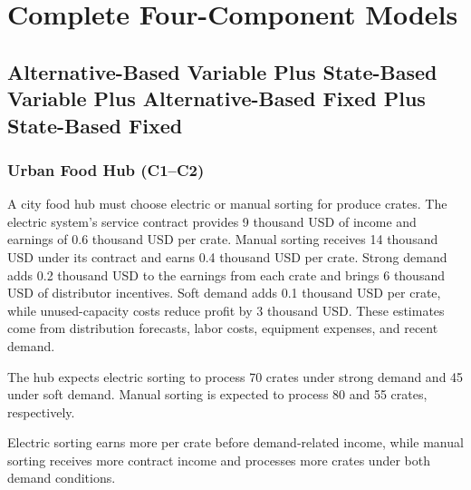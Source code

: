 	
	\section{Complete Four-Component Models}
	\label{sec:complete-models}


\subsection{Alternative-Based Variable Plus State-Based Variable Plus Alternative-Based Fixed Plus State-Based Fixed}
	\label{sec:alternative-based-and-state-based-variable-payoffs-plus-alternative-based-and-state-based-fixed-payoffs}



	\subsubsection{Urban Food Hub (C1--C2)}
	\label{sec:problem34-urban-food-hub-c1-c2}
	
	A city food hub must choose electric or manual sorting for produce crates. The electric system’s service contract provides 9 thousand USD of income and earnings of 0.6 thousand USD per crate. Manual sorting receives 14 thousand USD under its contract and earns 0.4 thousand USD per crate. Strong demand adds 0.2 thousand USD to the earnings from each crate and brings 6 thousand USD of distributor incentives. Soft demand adds 0.1 thousand USD per crate, while unused-capacity costs reduce profit by 3 thousand USD. These estimates come from distribution forecasts, labor costs, equipment expenses, and recent demand.
	
	The hub expects electric sorting to process 70 crates under strong demand and 45 under soft demand. Manual sorting is expected to process 80 and 55 crates, respectively.
	
	Electric sorting earns more per crate before demand-related income, while manual sorting receives more contract income and processes more crates under both demand conditions.

